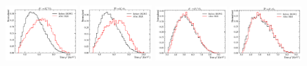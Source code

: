 \begin{figure}[ht]
    \centering
    \includegraphics[width=0.24\textwidth]{
        ./figs-mc-correction/reweighting-form-factors/DststTau/D0stst0Tau.pdf
    }
    \includegraphics[width=0.24\textwidth]{
        ./figs-mc-correction/reweighting-form-factors/DststTau/D0ststTau.pdf
    }
    \includegraphics[width=0.24\textwidth]{
        ./figs-mc-correction/reweighting-form-factors/DststTau/D1pstst0Tau.pdf
    }
    \includegraphics[width=0.24\textwidth]{
        ./figs-mc-correction/reweighting-form-factors/DststTau/D1pststTau.pdf
    }


\end{figure}

